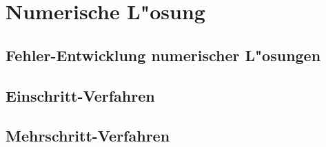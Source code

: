 %
%
%
\chapter{Numerische L"osung\label{chapter:numerik}}
\lhead{}
\section{Fehler-Entwicklung numerischer L"osungen}
\section{Einschritt-Verfahren}
\section{Mehrschritt-Verfahren}
